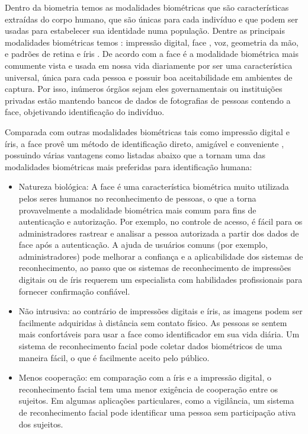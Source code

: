 Dentro da biometria temos as modalidades biométricas que são características extraídas do corpo humano, que são únicas para cada indivíduo e que podem ser usadas para estabelecer sua identidade numa população. Dentre as principais modalidades biométricas temos \cite{jain2004introduction}: impressão digital, face \cite{sharif2012survey}, voz, geometria da mão, e padrões de retina e íris \cite{galdi2016multimodal}. De acordo com  a face é a modalidade biométrica mais comumente vista e usada em nossa vida diariamente por ser uma característica universal, única para cada pessoa e possuir boa aceitabilidade em ambientes de captura. Por isso, inúmeros órgãos sejam eles governamentais ou instituições privadas estão mantendo bancos de dados de fotografias de pessoas contendo a face, objetivando identificação do indivíduo. 

Comparada com outras modalidades biométricas tais como impressão digital e íris, a face provê um método de identificação direto, amigável e conveniente \cite{[20]shermina2012recognition}, possuindo várias vantagens como listadas abaixo que a tornam uma das modalidades biométricas mais preferidas para identificação humana:
\begin{itemize}
\item Natureza biológica: A face é uma característica biométrica muito utilizada pelos seres humanos no reconhecimento de pessoas, o que a torna provavelmente a modalidade biométrica mais comum para fins de autenticação e autorização. Por exemplo, no controle de acesso, é fácil para os administradores rastrear e analisar a pessoa autorizada a partir dos dados de face após a autenticação. A ajuda de usuários comuns (por exemplo, administradores) pode melhorar a confiança e a aplicabilidade dos sistemas de reconhecimento, ao passo que os sistemas de reconhecimento de impressões digitais ou de íris requerem um especialista com habilidades profissionais para fornecer confirmação confiável.
\item Não intrusiva: ao contrário de impressões digitais e íris, as imagens podem ser facilmente adquiridas à distância sem contato físico. As pessoas se sentem mais confortáveis para usar a face como identificador em sua vida diária. Um sistema de reconhecimento facial pode coletar dados biométricos de uma maneira fácil, o que é facilmente aceito pelo público.
\item Menos cooperação: em comparação com a íris e a impressão digital, o reconhecimento facial tem uma menor exigência de cooperação entre os sujeitos. Em algumas aplicações particulares, como a vigilância, um sistema de reconhecimento facial pode identificar uma pessoa sem participação ativa dos sujeitos.
\end{itemize}

